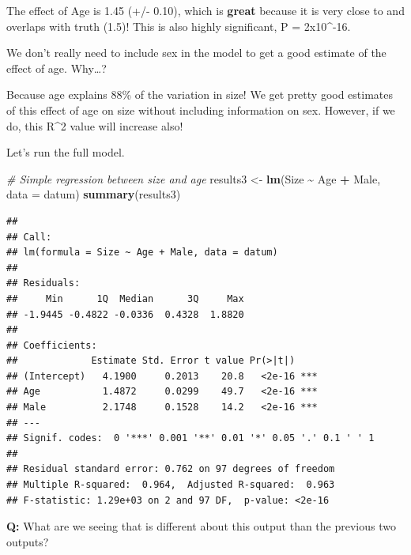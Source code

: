 \documentclass[
]{article}
\newenvironment{Shaded}{\begin{snugshade}}{\end{snugshade}}
\newcommand{\AttributeTok}[1]{\textcolor[rgb]{0.13,0.29,0.53}{#1}}
\newcommand{\CommentTok}[1]{\textcolor[rgb]{0.56,0.35,0.01}{\textit{#1}}}
\newcommand{\FunctionTok}[1]{\textcolor[rgb]{0.13,0.29,0.53}{\textbf{#1}}}
\newcommand{\NormalTok}[1]{#1}
\newcommand{\OtherTok}[1]{\textcolor[rgb]{0.56,0.35,0.01}{#1}}
\newcommand{\SpecialCharTok}[1]{\textcolor[rgb]{0.81,0.36,0.00}{\textbf{#1}}}
\begin{document}
The effect of Age is 1.45 (+/- 0.10), which is \textbf{great} because it
is very close to and overlaps with truth (1.5)! This is also highly
significant, P = 2x10\^{}-16.

We don't really need to include sex in the model to get a good estimate
of the effect of age. Why\ldots?

Because age explains 88\% of the variation in size! We get pretty good
estimates of this effect of age on size without including information on
sex. However, if we do, this R\^{}2 value will increase also!

Let's run the full model.

\begin{Shaded}
\begin{Highlighting}[]
\CommentTok{\# Simple regression between size and age }
\NormalTok{results3 }\OtherTok{\textless{}{-}} \FunctionTok{lm}\NormalTok{(Size }\SpecialCharTok{\textasciitilde{}}\NormalTok{ Age }\SpecialCharTok{+}\NormalTok{ Male, }\AttributeTok{data =}\NormalTok{ datum)}
\FunctionTok{summary}\NormalTok{(results3)}
\end{Highlighting}
\end{Shaded}

\begin{verbatim}
## 
## Call:
## lm(formula = Size ~ Age + Male, data = datum)
## 
## Residuals:
##     Min      1Q  Median      3Q     Max 
## -1.9445 -0.4822 -0.0336  0.4328  1.8820 
## 
## Coefficients:
##             Estimate Std. Error t value Pr(>|t|)    
## (Intercept)   4.1900     0.2013    20.8   <2e-16 ***
## Age           1.4872     0.0299    49.7   <2e-16 ***
## Male          2.1748     0.1528    14.2   <2e-16 ***
## ---
## Signif. codes:  0 '***' 0.001 '**' 0.01 '*' 0.05 '.' 0.1 ' ' 1
## 
## Residual standard error: 0.762 on 97 degrees of freedom
## Multiple R-squared:  0.964,  Adjusted R-squared:  0.963 
## F-statistic: 1.29e+03 on 2 and 97 DF,  p-value: <2e-16
\end{verbatim}

\textbf{Q:} What are we seeing that is different about this output than
the previous two outputs?
\end{document}
